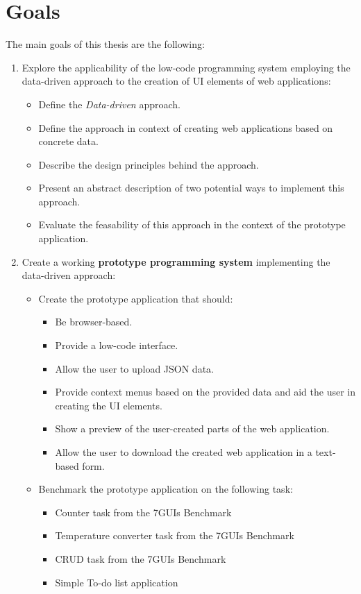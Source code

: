 \section*{Goals}
The main goals of this thesis are the following:
\begin{enumerate}
	\item Explore the applicability of the low-code programming system employing the data-driven approach to the creation of UI elements of web applications:
	      \begin{itemize}
		      \item Define the \emph{Data-driven} approach.
		      \item Define the approach in context of creating web applications based on concrete data.
		      \item Describe the design principles behind the approach.
		      \item Present an abstract description of two potential ways to implement this approach.
		      \item Evaluate the feasability of this approach in the context of the prototype application.
	      \end{itemize}
	\item Create a working \textbf{prototype programming system} implementing the data-driven approach:
	      \begin{itemize}
		      \item Create the prototype application that should:
		            \begin{itemize}
			            \item Be browser-based.
			            \item Provide a low-code interface.
			            \item Allow the user to upload JSON data.
			            \item Provide context menus based on the provided data and aid the user in creating the UI elements.
			            \item Show a preview of the user-created parts of the web application.
			            \item Allow the user to download the created web application in a text-based form.
		            \end{itemize}

		      \item Benchmark the prototype application on the following task:
		            \begin{itemize}
			            \item Counter task from the 7GUIs Benchmark
			            \item Temperature converter task from the 7GUIs Benchmark
			            \item CRUD task from the 7GUIs Benchmark
			            \item Simple To-do list application
		            \end{itemize}

	      \end{itemize}
\end{enumerate}

